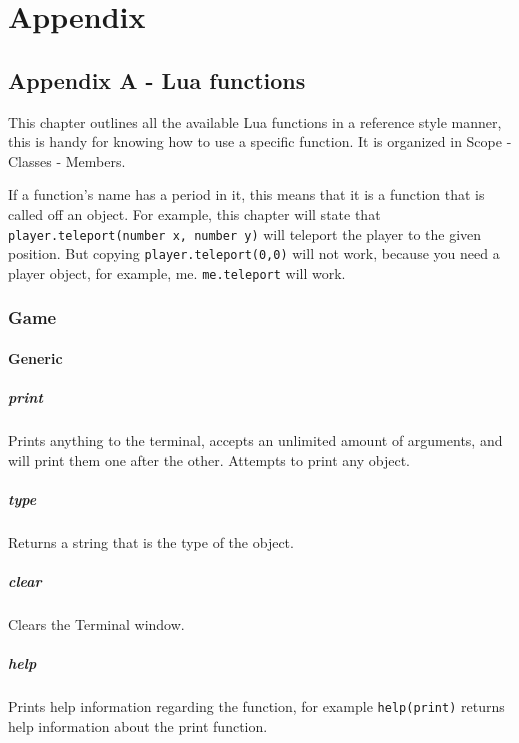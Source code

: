 \documentclass{book}
\begin{document}
\part{Appendix}
\chapter{Appendix A - Lua functions}
This chapter outlines all the available Lua functions in a reference style manner, this is handy for knowing how to use a specific function. It is organized in Scope - Classes - Members.

If a function's name has a period in it, this means that it is a function that is called off an object. For example, this chapter will state that \texttt{player.teleport(number x, number y)} will teleport the player to the given position. But copying \texttt{player.teleport(0,0)} will not work, because you need a player object, for example, me. \texttt{me.teleport} will work.

\section{Game}

\subsection{Generic}
\subsubsection{print}
Prints anything to the terminal, accepts an unlimited amount of arguments, and will print them one after the other. Attempts to print any object.

\subsubsection{type}
Returns a string that is the type of the object.

\subsubsection{clear}
Clears the Terminal window.

\subsubsection{help}
Prints help information regarding the function, for example \texttt{help(print)} returns help information about the print function.
\end{document}
